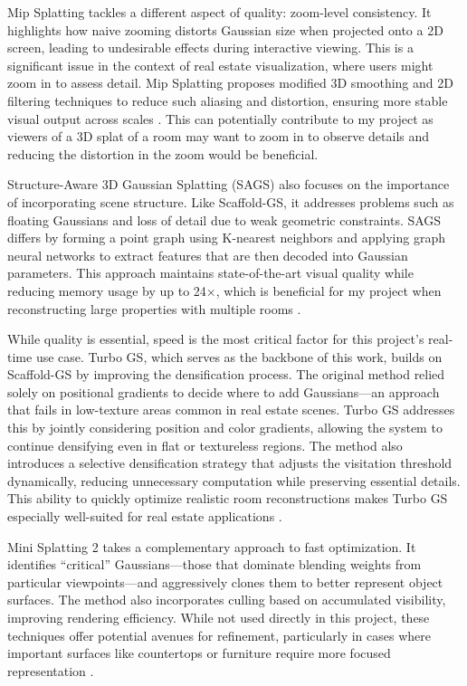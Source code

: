 \documentclass[10pt,twocolumn]{article}
\begin{document}
Mip Splatting tackles a different aspect of quality: zoom-level consistency. It highlights how naive zooming distorts Gaussian size when projected onto a 2D screen, leading to undesirable effects during interactive viewing. This is a significant issue in the context of real estate visualization, where users might zoom in to assess detail. Mip Splatting proposes modified 3D smoothing and 2D filtering techniques to reduce such aliasing and distortion, ensuring more stable visual output across scales \cite{yu2023mipsplattingaliasfree3dgaussian}. This can potentially contribute to my project as viewers of a 3D splat of a room may want to zoom in to observe details and reducing the distortion in the zoom would be beneficial. 

Structure-Aware 3D Gaussian Splatting (SAGS) also focuses on the importance of incorporating scene structure. Like Scaffold-GS, it addresses problems such as floating Gaussians and loss of detail due to weak geometric constraints. SAGS differs by forming a point graph using K-nearest neighbors and applying graph neural networks to extract features that are then decoded into Gaussian parameters. This approach maintains state-of-the-art visual quality while reducing memory usage by up to 24×, which is beneficial for my project when reconstructing large properties with multiple rooms \cite{ververas2024sagsstructureaware3dgaussian}.

While quality is essential, speed is the most critical factor for this project’s real-time use case. Turbo GS, which serves as the backbone of this work, builds on Scaffold-GS by improving the densification process. The original method relied solely on positional gradients to decide where to add Gaussians—an approach that fails in low-texture areas common in real estate scenes. Turbo GS addresses this by jointly considering position and color gradients, allowing the system to continue densifying even in flat or textureless regions. The method also introduces a selective densification strategy that adjusts the visitation threshold dynamically, reducing unnecessary computation while preserving essential details. This ability to quickly optimize realistic room reconstructions makes Turbo GS especially well-suited for real estate applications \cite{lu2024turbogsaccelerating3dgaussian}.

Mini Splatting 2 takes a complementary approach to fast optimization. It identifies “critical” Gaussians—those that dominate blending weights from particular viewpoints—and aggressively clones them to better represent object surfaces. The method also incorporates culling based on accumulated visibility, improving rendering efficiency. While not used directly in this project, these techniques offer potential avenues for refinement, particularly in cases where important surfaces like countertops or furniture require more focused representation \cite{fang2024minisplatting2building360scenes}.
\end{document}
